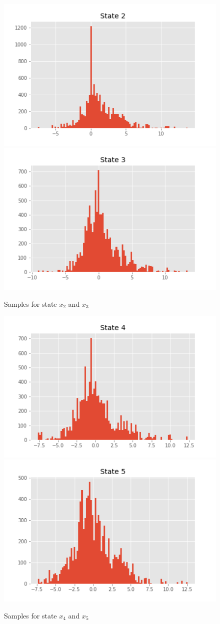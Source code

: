 \documentclass[]{article}
\begin{document}
	\begin{figure}[H]
		\begin{center}
			
			\includegraphics[width=.4\textwidth]{task2/figures/T_2_2/Q2/plt_x2.png}
			\includegraphics[width=.4\textwidth]{task2/figures/T_2_2/Q2/plt_x3.png}
			
			\caption*{Samples for state $x_2$ and $x_3$}
		\end{center}
	\end{figure}
	\begin{figure}[H]
		\begin{center}
			
			\includegraphics[width=.4\textwidth]{task2/figures/T_2_2/Q2/plt_x4.png}
			\includegraphics[width=.4\textwidth]{task2/figures/T_2_2/Q2/plt_x5.png}
			
			\caption*{Samples for state $x_4$ and $x_5$}
		\end{center}
	\end{figure}
\end{document}
